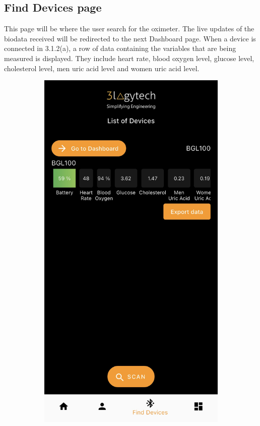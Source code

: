 \documentclass[a4paper]{scrreprt}
\begin{document}
\subsection{Find Devices page}
This page will be where the user search for the oximeter. The live updates of the biodata received will be redirected to the next Dashboard page.
\newline
When a device is connected in 3.1.2(a), a row of data containing the variables that are being measured is displayed. They include heart rate, blood oxygen level, glucose level, cholesterol level, men uric acid level and women uric acid level.
\newline
\begin{figure}[htbp]
    \centering
    \begin{subfigure}{0.45\textwidth}
        \centering
        \includegraphics[scale=0.15]{find_devices.jpeg}

\end{subfigure}
\end{figure}
\end{document}
